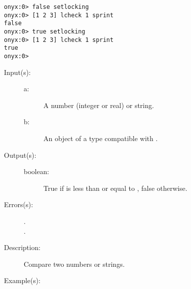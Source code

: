 \begin{description}
\begin{description}
\begin{verbatim}
onyx:0> false setlocking
onyx:0> [1 2 3] lcheck 1 sprint
false
onyx:0> true setlocking
onyx:0> [1 2 3] lcheck 1 sprint
true
onyx:0>
		\end{verbatim}
	\end{description}
\label{systemdict:le}
\item[{\onyxop{a b}{le}{boolean}}: ]
	\begin{description}\item[]
	\item[Input(s): ]
		\begin{description}\item[]
		\item[a: ]
			A number (integer or real) or string.
		\item[b: ]
			An object of a type compatible with .
		\end{description}
	\item[Output(s): ]
		\begin{description}\item[]
		\item[boolean: ]
			True if  is less than or equal to ,
			false otherwise.
		\end{description}
	\item[Errors(s): ]
		\begin{description}\item[]
		\item[.]
		\item[.]
		\end{description}
	\item[Description: ]
		Compare two numbers or strings.
	\item[Example(s): ]\begin{verbatim}


\end{verbatim}
\end{description}
\end{description}
